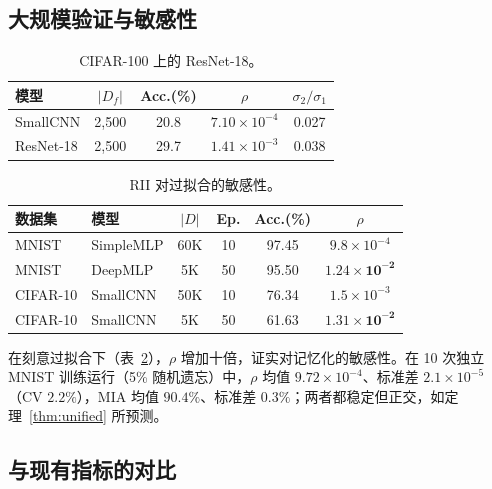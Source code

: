 \subsection{大规模验证与敏感性}
\label{app:extra}

\begin{table}[t]
\centering
\small
\caption{CIFAR-100 上的 ResNet-18。}\label{tab:resnet18}
\setlength{\tabcolsep}{3pt}
\begin{tabular}{l c c c c}
\toprule
模型 & $|D_f|$ & Acc.(\%) & $\rho$ & $\sigma_2/\sigma_1$ \\
\midrule
SmallCNN & 2,500 & 20.8 & $7.10{\times}10^{-4}$ & 0.027 \\
ResNet-18 & 2,500 & 29.7 & $1.41{\times}10^{-3}$ & 0.038 \\
\bottomrule
\end{tabular}
\end{table}

\begin{table}[t]
\centering
\small
\caption{RII 对过拟合的敏感性。}\label{tab:sensitivity}
\setlength{\tabcolsep}{2pt}
\begin{tabular}{l l c c c c}
\toprule
数据集 & 模型 & $|D|$ & Ep. & Acc.(\%) & $\rho$ \\
\midrule
MNIST   & SimpleMLP & 60K & 10  & 97.45 & $9.8{\times}10^{-4}$ \\
MNIST   & DeepMLP & 5K & 50 & 95.50 & $\mathbf{1.24{\times}10^{-2}}$ \\
CIFAR-10 & SmallCNN & 50K & 10  & 76.34 & $1.5{\times}10^{-3}$ \\
CIFAR-10 & SmallCNN & 5K & 50 & 61.63 & $\mathbf{1.31{\times}10^{-2}}$ \\
\bottomrule
\end{tabular}
\end{table}

在刻意过拟合下（表~\ref{tab:sensitivity}），$\rho$ 增加十倍，证实对记忆化的敏感性。在 10 次独立 MNIST 训练运行（5\% 随机遗忘）中，$\rho$ 均值 $9.72{\times}10^{-4}$、标准差 $2.1{\times}10^{-5}$（CV $2.2\%$），MIA 均值 $90.4\%$、标准差 $0.3\%$；两者都稳定但正交，如定理~\ref{thm:unified} 所预测。

\subsection{与现有指标的对比}

